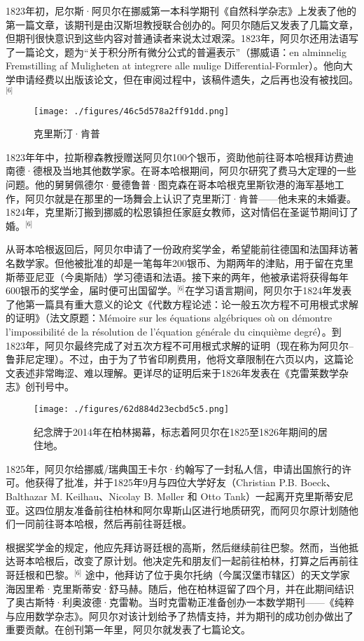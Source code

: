 1823年初，尼尔斯·阿贝尔在挪威第一本科学期刊《自然科学杂志》上发表了他的第一篇文章，该期刊是由汉斯坦教授联合创办的。阿贝尔随后又发表了几篇文章，但期刊很快意识到这些内容对普通读者来说太过艰深。1823年，阿贝尔还用法语写了一篇论文，题为“关于积分所有微分公式的普遍表示”（挪威语：en alminnelig Fremstilling af Muligheten at integrere alle mulige Differential-Formler）。他向大学申请经费以出版该论文，但在审阅过程中，该稿件遗失，之后再也没有被找回。\(^\text{[6]}\)
\begin{figure}[ht]
\centering
\texttt{[image: ./figures/46c5d578a2ff91dd.png]}
\caption{克里斯汀·肯普} \label{fig_NRSAB_3}
\end{figure}
1823年年中，拉斯穆森教授赠送阿贝尔100个银币，资助他前往哥本哈根拜访费迪南德·德根及当地其他数学家。在哥本哈根期间，阿贝尔研究了费马大定理的一些问题。他的舅舅佩德尔·曼德鲁普·图克森在哥本哈根克里斯钦港的海军基地工作，阿贝尔就是在那里的一场舞会上认识了克里斯汀·肯普——他未来的未婚妻。1824年，克里斯汀搬到挪威的松恩镇担任家庭女教师，这对情侣在圣诞节期间订了婚。\(^\text{[6]}\)

从哥本哈根返回后，阿贝尔申请了一份政府奖学金，希望能前往德国和法国拜访著名数学家。但他被批准的却是一笔每年200银币、为期两年的津贴，用于留在克里斯蒂亚尼亚（今奥斯陆）学习德语和法语。接下来的两年，他被承诺将获得每年600银币的奖学金，届时便可出国留学。\(^\text{[6]}\)在学习语言期间，阿贝尔于1824年发表了他第一篇具有重大意义的论文《代数方程论述：论一般五次方程不可用根式求解的证明》（法文原题：Mémoire sur les équations algébriques où on démontre l'impossibilité de la résolution de l'équation générale du cinquième degré）。到1823年，阿贝尔最终完成了对五次方程不可用根式求解的证明（现在称为阿贝尔–鲁菲尼定理）。不过，由于为了节省印刷费用，他将文章限制在六页以内，这篇论文表述非常晦涩、难以理解。更详尽的证明后来于1826年发表在《克雷莱数学杂志》创刊号中。
\begin{figure}[ht]
\centering
\texttt{[image: ./figures/62d884d23ecbd5c5.png]}
\caption{纪念牌于2014年在柏林揭幕，标志着阿贝尔在1825至1826年期间的居住地。} \label{fig_NRSAB_4}
\end{figure}
1825年，阿贝尔给挪威/瑞典国王卡尔·约翰写了一封私人信，申请出国旅行的许可。他获得了批准，并于1825年9月与四位大学好友（Christian P.B. Boeck、Balthazar M. Keilhau、Nicolay B. Møller 和 Otto Tank）一起离开克里斯蒂安尼亚。这四位朋友准备前往柏林和阿尔卑斯山区进行地质研究，而阿贝尔原计划随他们一同前往哥本哈根，然后再前往哥廷根。

根据奖学金的规定，他应先拜访哥廷根的高斯，然后继续前往巴黎。然而，当他抵达哥本哈根后，改变了原计划。他决定先和朋友们一起前往柏林，打算之后再前往哥廷根和巴黎。\(^\text{[6]}\)
途中，他拜访了位于奥尔托纳（今属汉堡市辖区）的天文学家海因里希·克里斯蒂安·舒马赫。随后，他在柏林逗留了四个月，并在此期间结识了奥古斯特·利奥波德·克雷勒。当时克雷勒正准备创办一本数学期刊——《纯粹与应用数学杂志》。阿贝尔对该计划给予了热情支持，并为期刊的成功创办做出了重要贡献。在创刊第一年里，阿贝尔就发表了七篇论文。

